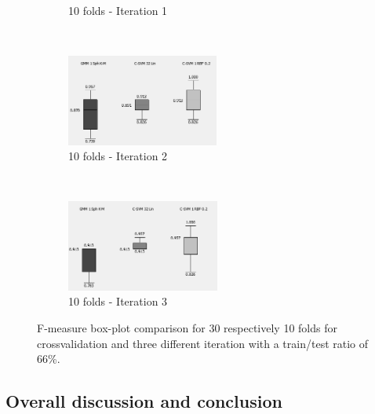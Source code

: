 \documentclass[a4paper,10pt]{article}
\begin{document}
\begin{figure}[H]
\begin{subfigure}[t]{0.3\textwidth}
      \caption{10 folds - Iteration 1}
      \label{fig:10-fold-train-test-ratio-66percent-test-data-A}
     \end{subfigure}
     ~
     \begin{subfigure}[t]{0.3\textwidth}
      \centering
      \includegraphics[height=3cm]{pictures/10-fold-train-test-ratio-66percent-test-data-B}
      \caption{10 folds - Iteration 2}
      \label{fig:10-fold-train-test-ratio-66percent-test-data-B}
     \end{subfigure}
      ~
    \begin{subfigure}[t]{0.3\textwidth}
      \centering
      \includegraphics[height=3cm]{pictures/10-fold-train-test-ratio-66percent-test-data-C}
      \caption{10 folds - Iteration 3}
      \label{fig:10-fold-train-test-ratio-66percent-test-data-C}
     \end{subfigure}
     \caption{F-measure box-plot comparison for 30 respectively 10 folds for crossvalidation and three different iteration with a train/test ratio of 66\%.}
     \label{fig:robustness-fold}
\end{figure}

\subsection{Overall discussion and conclusion}

\end{document}
